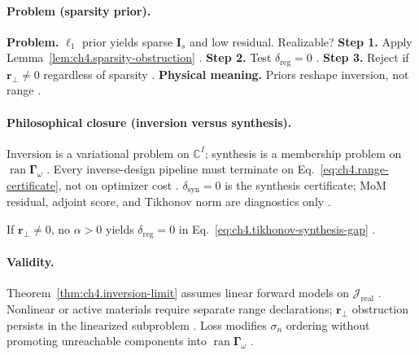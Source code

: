 \paragraph{Problem (sparsity prior).}
\textbf{Problem.} \(\ell_{1}\) prior yields sparse \(\mathbf{I}_{s}\) and low residual. Realizable?
\textbf{Step 1.} Apply Lemma~\ref{lem:ch4.sparsity-obstruction} \cite{harrington2001,devaney2004}.
\textbf{Step 2.} Test \(\delta_{\mathrm{reg}}=0\) \cite{stratton1941}.
\textbf{Step 3.} Reject if \(\mathbf{r}_{\perp}\neq0\) regardless of sparsity \cite{hansen1988}.
\textbf{Physical meaning.} Priors reshape inversion, not range \cite{stratton1941}.

\paragraph{Philosophical closure (inversion versus synthesis).}
Inversion is a variational problem on \(\mathbb{C}^{I}\); synthesis is a membership problem on \(\operatorname{ran}\boldsymbol{\Gamma}_\omega\)
\cite{stratton1941,harrington2001,devaney2004}. Every inverse-design pipeline must terminate on Eq.~\eqref{eq:ch4.range-certificate}, not on optimizer
cost \cite{hansen1988}. \(\delta_{\mathrm{syn}}=0\) is the synthesis certificate; MoM residual, adjoint score, and Tikhonov norm are diagnostics only
\cite{stratton1941,harrington2001}.

\begin{corollary}
\label{cor:ch4.tikhonov-unreachable}
If \(\mathbf{r}_{\perp}\neq0\), no \(\alpha>0\) yields \(\delta_{\mathrm{reg}}=0\) in Eq.~\eqref{eq:ch4.tikhonov-synthesis-gap}
\cite{harrington2001,devaney2004,stratton1941,hansen1988}.
\end{corollary}

\paragraph{Validity.}
Theorem~\ref{thm:ch4.inversion-limit} assumes linear forward models on \(\mathcal{J}_{\mathrm{real}}\) \cite{stratton1941}. Nonlinear or active
materials require separate range declarations; \(\mathbf{r}_{\perp}\) obstruction persists in the linearized subproblem \cite{harrington2001,devaney2004}.
Loss modifies \(\sigma_{n}\) ordering without promoting unreachable components into \(\operatorname{ran}\boldsymbol{\Gamma}_\omega\) \cite{hansen1988}.
